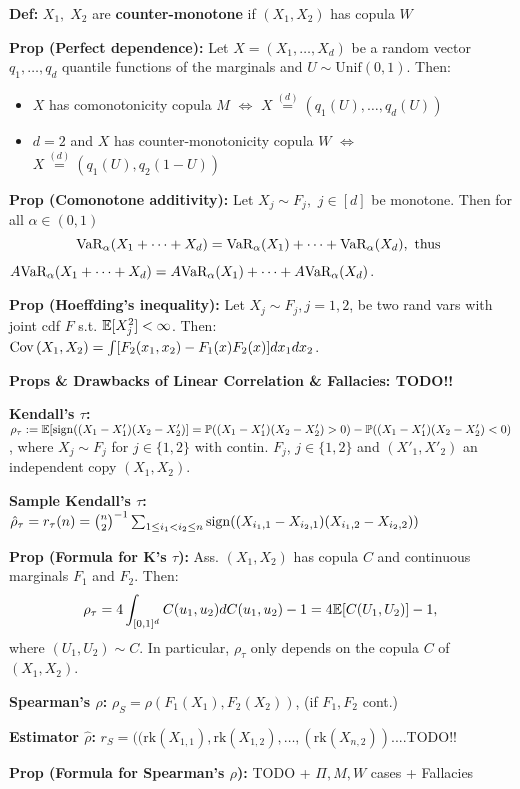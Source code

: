 \textbf{Def:} $X_1,\; X_2$ are \textbf{counter-monotone} if $(X_1,X_2)$ has copula $W$

\textbf{Prop (Perfect dependence):} Let $X=(X_1,\dots,X_d)$ be a random vector $q_1,\dots, q_d$ quantile functions of the marginals and $U\sim\text{Unif}(0,1)$. Then:
\begin{itemize}
    \item $X$ has comonotonicity copula $M$ $\iff$ $X\stackrel{(d)}{=}(q_1(U),\dots,q_d(U))$
    \item $d=2$ and $X$ has counter-monotonicity copula $W$ $\iff$ $X\stackrel{(d)}{=}(q_1(U),q_2(1-U))$
\end{itemize}

\textbf{Prop (Comonotone additivity):} Let $X_j\sim F_j,$ $j\in[d]$ be monotone. Then for all $\alpha\in(0,1)$
\[ \text{VaR}_\alpha(X_1+\dots+X_d)= \text{VaR}_\alpha(X_1)+\dots+\text{VaR}_\alpha(X_d), \text{ thus }\]
 $A\text{VaR}_\alpha(X_1+\dots+X_d)= A\text{VaR}_\alpha(X_1)+\dots+A\text{VaR}_\alpha(X_d) $.
 
\textbf{Prop (Hoeffding's inequality):} Let $X_j\sim F_j, j=1,2$, be two rand vars with joint cdf $F$ s.t. $\mathbb{E}[X_j^2]<\infty$. Then:\\
$\operatorname{Cov}\left(X_1,X_2 \right)=\int [F_2(x_1,x_2)-F_1(x)F_2(x)]dx_1 dx_2$.

\textbf{Props \& Drawbacks of Linear Correlation \& Fallacies: TODO!!}

\textbf{Kendall's $\tau$:} 
$\rho_\tau:=\mathbb{E}[\operatorname{sign}((X_1-X_1')(X_2-X'_2)]=\mathbb{P}((X_1-X_1')(X_2-X'_2)>0)-\mathbb{P}((X_1-X_1')(X_2-X'_2)<0)$,
where $X_j\sim F_j$ for $j\in\{1,2\}$ with contin. $F_j$, $j\in\{1,2\}$ and $(X'_1,X'_2)$ an independent copy $(X_1,X_2)$.

\textbf{Sample Kendall's $\tau$:}\\
$\hat\rho_\tau=r_\tau(n)=\binom{n}{2}^{-1}\sum_{1\leq i_1<i_2\leq n} \operatorname{sign}((X_{i_1,1}-X_{i_2,1})(X_{i_1,2}-X_{i_2,2}))$

\textbf{Prop (Formula for K's $\tau$):} Ass. $(X_1,X_2)$ has copula $C$ and continuous marginals $F_1$ and $F_2$. Then:
\[\rho_\tau=4\int_{[0,1]^d} C(u_1,u_2)dC(u_1,u_2)-1=4\mathbb{E}[C(U_1,U_2)]-1,\]  where $(U_1,U_2)\sim C$. 
In particular, $\rho_\tau$ only depends on the copula $C$ of $(X_1,X_2)$.

\textbf{Spearman's $\rho$:} $\rho_S=\rho(F_1(X_1),F_2(X_2))$, (if $F_1,F_2$ cont.)

\textbf{Estimator $\hat\rho$:} $r_S=((\text{rk}(X_{1,1}),\text{rk}(X_{1,2}),\dots,(\text{rk}(X_{n,2}))$....TODO!!

\textbf{Prop (Formula for Spearman's $\rho$):} TODO + $\Pi, M, W$ cases + Fallacies

